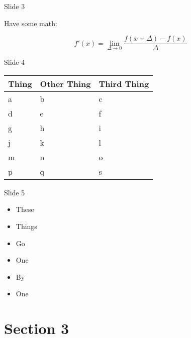 \documentclass{beamer}
\begin{document}
\begin{frame}{Slide 3}\begin{center}
Have some math:

{\Large \[
f'(x) = \mathop {\lim }\limits_{\Delta \to 0} \frac{{f\left( {x + \Delta } \right) - f\left( x \right)}}{\Delta }
\]
}
\end{center}\end{frame}


\begin{frame}{Slide 4}\begin{center}
\begin{tabular}{|l|l|l|}
\hline
{\bf Thing} & {\bf Other Thing} & {\bf Third Thing} \\
\hline
a & b & c\\
d & e & f \\
g & h & i \\
j & k & l \\
m & n & o \\
p & q & s \\
\hline
\end{tabular}
\end{center}\end{frame}

\begin{frame}{Slide 5}\begin{center}
\begin{itemize}
\item These
\pause
\item Things
\pause
\item Go
\pause
\item One
\pause
\item By
\pause
\item One
\end{itemize}
\end{center}\end{frame}


\section{Section 3}
\subsection{}
\end{document}
